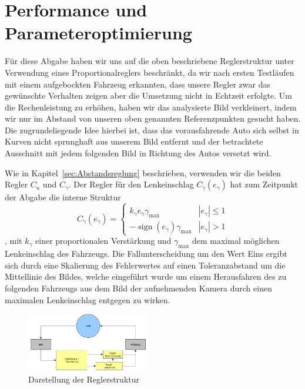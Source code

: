 \documentclass[10pt]{article}
\DeclareMathOperator{\sign}{sign}
\begin{document}
\section{Performance und Parameteroptimierung}
    Für diese Abgabe haben wir uns auf die oben beschriebene Reglerstruktur unter Verwendung eines Proportionalreglers beschränkt, da wir nach ersten Testläufen mit einem aufgebockten Fahrzeug erkannten, dass unsere Regler zwar das gewünschte Verhalten zeigen aber die Umsetzung nicht in Echtzeit erfolgte.
    Um die Rechenleistung zu erhöhen, haben wir das analysierte Bild verkleinert, indem wir nur im Abstand von unseren oben genannten Referenzpunkten gesucht haben.
    Die zugrundeliegende Idee hierbei ist, dass das vorausfahrende Auto sich selbst in Kurven nicht sprunghaft aus unserem Bild entfernt und der betrachtete Ausschnitt mit jedem folgenden Bild in Richtung des Autos versetzt wird.

    Wie in Kapitel~\ref{sec:Abstandsreglung} beschrieben, verwenden wir die beiden Regler $C_u$ und $C_{\gamma}$.
    Der Regler für den Lenkeinschlag $C_{\gamma}(e_{\gamma})$ hat zum Zeitpunkt der Abgabe die interne Struktur
    \[
    C_{\gamma}(e_{\gamma}) = \begin{cases}
        k_{\gamma}e_{\gamma}\gamma_{\max} & |e_{\gamma}| \leq 1 \\
        -\sign (e_{\gamma})\gamma_{\max}  & |e_{\gamma}| > 1
    \end{cases}
    \], mit $k_{\gamma}$ einer proportionalen Verstärkung und $\gamma_{\max}$ dem maximal möglichen Lenkeinschlag des Fahrzeugs.
    Die Fallunterscheidung um den Wert Eins ergibt sich durch eine Skalierung des Fehlerwertes auf einen Toleranzabstand um die Mittellinie des Bildes, welche eingeführt wurde um einem Herausfahren des zu folgenden Fahrzeugs aus dem Bild der aufnehmenden Kamera durch einen maximalen Lenkeinschlag entgegen zu wirken.
    \begin{figure}
        \centering
        \includegraphics[width=0.48\textwidth]{Autonomes_Fahren_Welt_Regler}
        \caption{Darstellung der Reglerstruktur}
        \label{fig:struktur}
    \end{figure}
\end{document}
